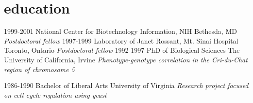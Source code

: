 \documentclass[]{dmc-cv} %
\begin{document}

\section{education}

\begin{entrylist}
\entry
{1999-2001}
{National Center for Biotechnology Information, NIH}
{Bethesda, MD}
{\emph{Postdoctoral fellow}
}
\entry
{1997-1999}
{Laboratory of Janet Rossant, Mt. Sinai Hospital}
{Toronto, Ontario}
{\emph{Postdoctoral fellow}
}
\entry
{1992-1997}
{PhD {\normalfont of Biological Sciences}}
{The University of California, Irvine}
{\emph{Phenotype-genotype correlation in the Cri-du-Chat region of chromosome 5}
}

\entry
{1986-1990}
{Bachelor {\normalfont of Liberal Arts}}
{University of Virginia}
{\emph{Research project focused on cell cycle regulation using yeast}
}
\end{entrylist}



\end{document}
